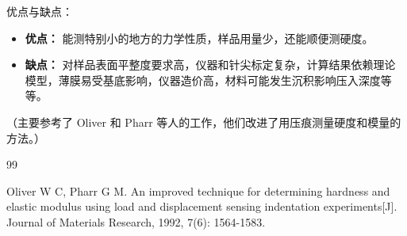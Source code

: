 \documentclass[12pt]{article}
\begin{document}
优点与缺点：
\begin{itemize}
    \item \textbf{优点：} 能测特别小的地方的力学性质，样品用量少，还能顺便测硬度。
    \item \textbf{缺点：} 对样品表面平整度要求高，仪器和针尖标定复杂，计算结果依赖理论模型，薄膜易受基底影响，仪器造价高，材料可能发生沉积影响压入深度等等。
\end{itemize}

（主要参考了 Oliver 和 Pharr 等人的工作\cite{ref1}，他们改进了用压痕测量硬度和模量的方法。）

\renewcommand{\refname}{参考文献}
\begin{thebibliography}{99}  

    Oliver W C, Pharr G M. An improved technique for determining hardness and elastic modulus using load and displacement sensing indentation experiments[J]. Journal of Materials Research, 1992, 7(6): 1564-1583.
    
\end{thebibliography}
\end{document}
